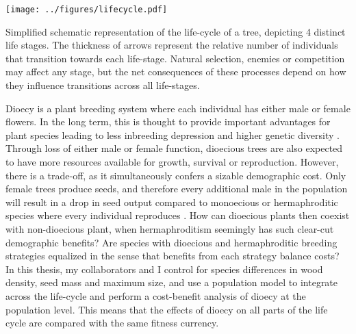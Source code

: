 \documentclass[b5paper,justified]{tufte-book} %
\begin{document}
\begin{marginfigure}[7cm]
\texttt{[image: ../figures/lifecycle.pdf]}
\caption[Simplified schematic representation of the life-cycle of a tree]{Simplified schematic representation of the life-cycle of a tree, depicting 4 distinct life stages. The thickness of arrows represent the relative number of individuals that transition towards each life-stage. Natural selection, enemies or competition may affect any stage, but the net consequences of these processes depend on how they influence transitions across all life-stages. }
\label{fig:fulllifecycle}
\end{marginfigure}

Dioecy is a plant breeding system where each individual has either male or female flowers. In the long term, this is thought to provide important advantages for plant species leading to less inbreeding depression and higher genetic diversity \citep{Bawa1980, Givnish1982, Barton2009}. Through loss of either male or female function, dioecious trees are also expected to have more resources available for growth, survival or reproduction. However, there is a trade-off, as it simultaneously confers a sizable demographic cost. Only female trees produce seeds, and therefore every additional male in the population will result in a drop in seed output compared to monoecious or hermaphroditic species where every individual reproduces \citep{Crawley1996}.  How can dioecious plants then coexist with non-dioecious plant, when hermaphroditism seemingly has such clear-cut demographic benefits? Are species with dioecious and hermaphroditic breeding strategies equalized in the sense that benefits from each strategy balance costs?  In this thesis, my collaborators and I control for species differences in wood density, seed mass and maximum size, and use a population model to integrate across the life-cycle and perform a cost-benefit analysis of dioecy at the population level. This means that the effects of dioecy on all parts of the life cycle are compared with the same fitness currency. 
\end{document}

